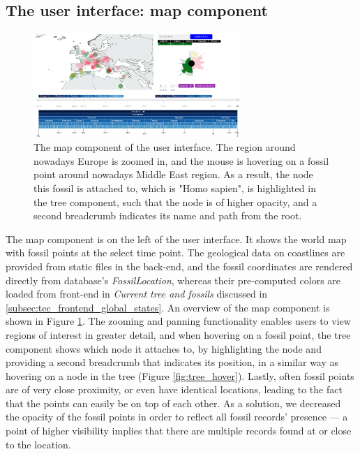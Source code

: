 \documentclass[11pt, a4paper,oneside,chapterprefix=false]{scrbook}
\begin{document}
\clearpage
\subsection{The user interface: map component}\label{subsec:tec_frontend_map}
\begin{figure}[h]
	\centering
	\includegraphics[width=0.7\textwidth]{figures/technical_solution/map}
	\caption{The map component of the user interface. The region around nowadays Europe is zoomed in, and the mouse is hovering on a fossil point around nowadays Middle East region. As a result, the node this fossil is attached to, which is "Homo sapien", is highlighted in the tree component, such that the node is of higher opacity, and a second breadcrumb indicates its name and path from the root. }
	\label{fig:map}
\end{figure}
The map component is on the left of the user interface. It shows the world map with fossil points at the select time point. The geological data on coastlines are provided from static files in the back-end, and the fossil coordinates are rendered directly from database's \emph{FossilLocation}, whereas their pre-computed colors are loaded from front-end in \emph{Current tree and fossils} discussed in \ref{subsec:tec_frontend_global_states}. An overview of the map component is shown in Figure \ref{fig:map}. The zooming and panning functionality enables users to view regions of interest in greater detail, and when hovering on a fossil point, the tree component shows which node it attaches to, by highlighting the node and providing a second breadcrumb that indicates its position, in a similar way as hovering on a node in the tree (Figure \ref{fig:tree_hover}). Lastly, often fossil points are of very close proximity, or even have identical locations, leading to the fact that the points can easily be on top of each other. As a solution, we decreased the opacity of the fossil points in order to reflect all fossil records' presence --- a point of higher visibility implies that there are multiple records found at or close to the location. \\
\end{document}
